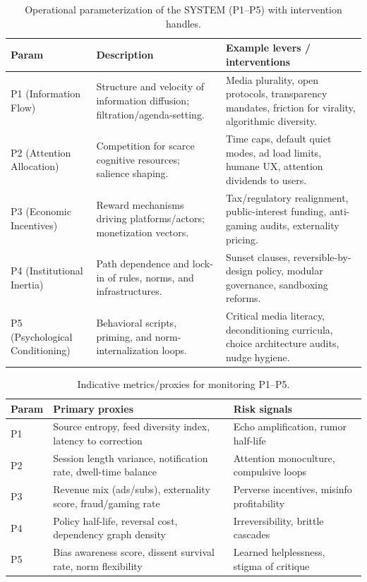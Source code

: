 \documentclass[11pt,a4paper]{article}
\theoremstyle{definition}
\theoremstyle{remark}
\begin{document}
\begin{table}[h]
\centering
\caption{Operational parameterization of the SYSTEM (P1–P5) with intervention handles.}
\label{tab:system_p_params}
\renewcommand{\arraystretch}{1.12}
\begin{tabularx}{\linewidth}{@{}lXX@{}}
\toprule
\textbf{Param} & \textbf{Description} & \textbf{Example levers / interventions} \\
\midrule
P1 (Information Flow) & Structure and velocity of information diffusion; filtration/agenda-setting. &
Media plurality, open protocols, transparency mandates, friction for virality, algorithmic diversity. \\
P2 (Attention Allocation) & Competition for scarce cognitive resources; salience shaping. &
Time caps, default quiet modes, ad load limits, humane UX, attention dividends to users. \\
P3 (Economic Incentives) & Reward mechanisms driving platforms/actors; monetization vectors. &
Tax/regulatory realignment, public-interest funding, anti-gaming audits, externality pricing. \\
P4 (Institutional Inertia) & Path dependence and lock-in of rules, norms, and infrastructures. &
Sunset clauses, reversible-by-design policy, modular governance, sandboxing reforms. \\
P5 (Psychological Conditioning) & Behavioral scripts, priming, and norm-internalization loops. &
Critical media literacy, deconditioning curricula, choice architecture audits, nudge hygiene. \\
\bottomrule
\end{tabularx}
\end{table}

\begin{table}[h]
\centering
\caption{Indicative metrics/proxies for monitoring P1–P5.}
\label{tab:system_p_metrics}
\renewcommand{\arraystretch}{1.12}
\begin{tabularx}{\linewidth}{@{}lXX@{}}
\toprule
\textbf{Param} & \textbf{Primary proxies} & \textbf{Risk signals} \\
\midrule
P1 & Source entropy, feed diversity index, latency to correction & Echo amplification, rumor half-life \\
P2 & Session length variance, notification rate, dwell-time balance & Attention monoculture, compulsive loops \\
P3 & Revenue mix (ads/subs), externality score, fraud/gaming rate & Perverse incentives, misinfo profitability \\
P4 & Policy half-life, reversal cost, dependency graph density & Irreversibility, brittle cascades \\
P5 & Bias awareness score, dissent survival rate, norm flexibility & Learned helplessness, stigma of critique \\
\bottomrule
\end{tabularx}
\end{table}
\end{document}

